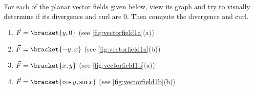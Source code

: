{For each of the planar vector fields given below, view its graph and try to visually determine if its divergence and curl are 0. Then compute the divergence and curl.

\begin{enumerate}
	\item $\vec F =\bracket{y,0}$ (see \autoref{fig:vectorfield1a}(a))
	\item $\vec F =\bracket{-y,x}$ (see \autoref{fig:vectorfield1a}(b))
	\item $\vec F =\bracket{x,y}$ (see \autoref{fig:vectorfield1b}(a))
	\item $\vec F =\bracket{\cos y, \sin x}$ (see \autoref{fig:vectorfield1b}(b))
\end{enumerate}}
